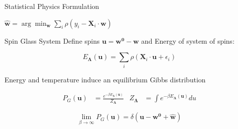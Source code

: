 \documentclass[pdf]{beamer}
\begin{document}
\begin{frame}[t]{Statistical Physics Formulation}
\begin{center}
$\mathbf{\hat{w}}=\arg \min_{\mathbf{w}}{ \sum_{i} {\rho\left( y_i - \mathbf{X}_{i} \cdot \mathbf{w}\right)}}$
\end{center}

\begin{block}{Spin Glass System}
Define spins $\mathbf{u}=\mathbf{w^0}-\mathbf{w}$ and Energy of system of spins:

\begin{equation*}
 E_{\boldsymbol{\Lambda}}(\mathbf{u})=\sum_i{\rho\left(\mathbf{X}_{i}\cdot \mathbf{u} +\epsilon_i\right)}
\end{equation*}

Energy and temperature induce an equilibrium Gibbs distribution

\begin{align*}
P_{G}(\mathbf{u}) &= \frac{e^{-\beta E_{\boldsymbol{\Lambda}}(\mathbf{u})}}{Z_{\boldsymbol{\Lambda}}} & Z_{\boldsymbol{\Lambda}} &= \int{e^{-\beta E_{\boldsymbol{\Lambda}} (\mathbf{u}) }du}
\end{align*}

\begin{equation*}
\lim_{\beta \rightarrow \infty} P_{G}(\mathbf{u}) = \delta\left(\mathbf{u} - \mathbf{w^0} +\mathbf{\hat{w}}\right)
\end{equation*}

\end{block}


\end{frame}
\end{document}
